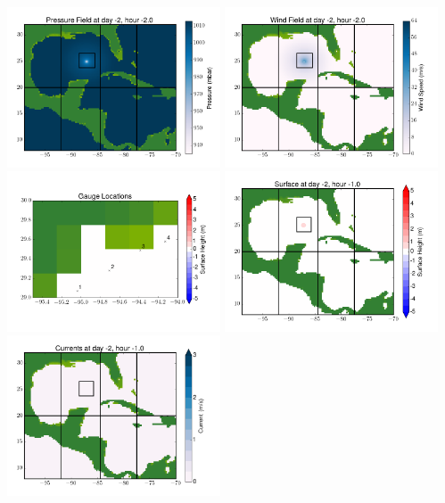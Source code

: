 \documentclass[11pt]{article}
\begin{document}
\includegraphics[width=0.475\textwidth]{frame0022fig8.png}
\vskip 10pt 
\includegraphics[width=0.475\textwidth]{frame0022fig9.png}
\includegraphics[width=0.475\textwidth]{frame0022fig10.png}
\vskip 10pt 
\includegraphics[width=0.475\textwidth]{frame0023fig1.png}
\includegraphics[width=0.475\textwidth]{frame0023fig2.png}
\end{document}
